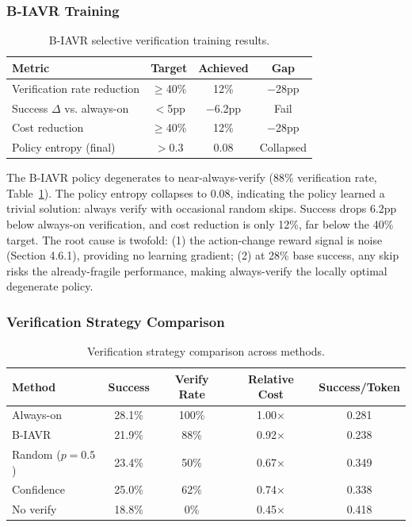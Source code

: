 \documentclass[11pt]{article}
\begin{document}
\subsubsection{B-IAVR Training}

\begin{table}[h]
\centering
\caption{B-IAVR selective verification training results.}
\label{tab:biavr}
\begin{tabular}{lccc}
\toprule
Metric & Target & Achieved & Gap \\
\midrule
Verification rate reduction & $\geq$40\% & 12\%   & $-$28pp \\
Success $\Delta$ vs. always-on & $<$5pp   & $-$6.2pp & Fail \\
Cost reduction               & $\geq$40\% & 12\%   & $-$28pp \\
Policy entropy (final)       & $>$0.3    & 0.08   & Collapsed \\
\bottomrule
\end{tabular}
\end{table}

The B-IAVR policy degenerates to near-always-verify (88\% verification rate, Table~\ref{tab:biavr}).
The policy entropy collapses to 0.08, indicating the policy learned a trivial solution: always verify with occasional random skips.
Success drops 6.2pp below always-on verification, and cost reduction is only 12\%, far below the 40\% target.
The root cause is twofold: (1) the action-change reward signal is noise (Section 4.6.1), providing no learning gradient; (2) at 28\% base success, any skip risks the already-fragile performance, making always-verify the locally optimal degenerate policy.

\subsubsection{Verification Strategy Comparison}

\begin{table}[h]
\centering
\caption{Verification strategy comparison across methods.}
\label{tab:verifycomp}
\begin{tabular}{lcccc}
\toprule
Method & Success & Verify Rate & Relative Cost & Success/Token \\
\midrule
Always-on         & 28.1\% & 100\% & 1.00$\times$ & 0.281 \\
B-IAVR            & 21.9\% & 88\%  & 0.92$\times$ & 0.238 \\
Random ($p{=}0.5$) & 23.4\% & 50\%  & 0.67$\times$ & 0.349 \\
Confidence        & 25.0\% & 62\%  & 0.74$\times$ & 0.338 \\
No verify         & 18.8\% & 0\%   & 0.45$\times$ & 0.418 \\
\bottomrule
\end{tabular}
\end{table}
\end{document}
